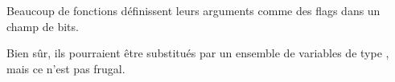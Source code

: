 \mysection{\BitfieldsChapter}
\label{sec:bitfields}

Beaucoup de fonctions définissent leurs arguments comme des flags dans un champ
de bits.

Bien sûr, ils pourraient être substitués par un ensemble de variables de type \Tbool,
mais ce n'est pas frugal.








